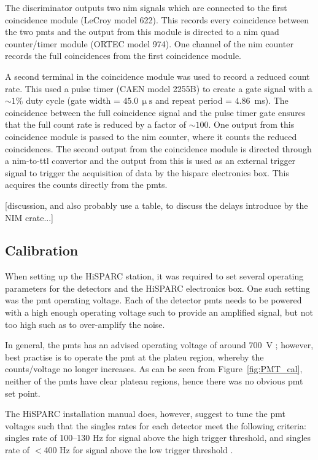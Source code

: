 The discriminator outputs two \gls{nim} signals which are connected to the first coincidence module (LeCroy model 622). This records every coincidence between the two \glspl{pmt} and the output from this module is directed to a \gls{nim} quad counter/timer module (ORTEC model 974). One channel of the \gls{nim} counter records the full coincidences from the first coincidence module.

A second terminal in the coincidence module was used to record a reduced count rate. This used a pulse timer (CAEN model 2255B) to create a gate signal with a $\sim 1\%$ duty cycle (gate width = $45.0 \, \upmu\mathrm{s}$ and repeat period = $4.86$~ms). The coincidence between the full coincidence signal and the pulse timer gate ensures that the full count rate is reduced by a factor of $\sim 100$. One output from this coincidence module is passed to the \gls{nim} counter, where it counts the reduced coincidences. The second output from the coincidence module is directed through a \gls{nim}-to-\gls{ttl} convertor and the output from this is used as an external trigger signal to trigger the acquisition of data by the \gls{hisparc} electronics box. This acquires the counts directly from the \glspl{pmt}.

[discussion, and also probably use a table, to discuss the delays introduce by the NIM crate...]


\subsection{Calibration}

When setting up the HiSPARC station, it was required to set several operating parameters for the detectors and the HiSPARC electronics box. One such setting was the \gls{pmt} operating voltage. Each of the detector \glspl{pmt} needs to be powered with a high enough operating voltage such to provide an amplified signal, but not too high such as to over-amplify the noise.

In general, the \glspl{pmt} has an advised operating voltage of around 700~V \citep{fokkema_hisparc_2019}; however, best practise is to operate the \gls{pmt} at the plateu region, whereby the counts/voltage no longer increases. As can be seen from Figure~\ref{fig:PMT_cal}, neither of the \glspl{pmt} have clear plateau regions, hence there was no obvious \gls{pmt} set point.

The HiSPARC installation manual does, however, suggest to tune the \gls{pmt} voltages such that the singles rates for each detector meet the following criteria: singles rate of 100--130 Hz for signal above the high trigger threshold, and singles rate of $<$400 Hz for signal above the low trigger threshold \citep{fokkema_hisparc_2019}.

